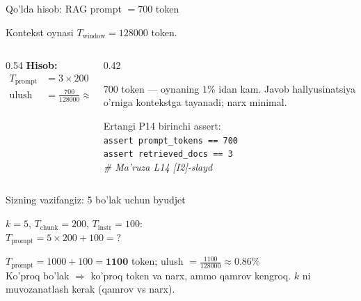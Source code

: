 \documentclass[aspectratio=169,11pt]{beamer}
\begin{document}
%
\begin{frame}{Qo'lda hisob: RAG prompt $= 700$ token}
  \begin{tcolorbox}[defbox,title={Berilgan: $k=3$, $T_{\text{chunk}}=200$, $T_{\text{instr}}=100$}]
    \small Kontekst oynasi $T_{\text{window}} = 128000$ token.
  \end{tcolorbox}
  \vspace{0.2em}
  \begin{columns}[T]
    \begin{column}{0.54\textwidth}
      \textbf{Hisob:}
      \begin{align*}
        T_{\text{prompt}} &= 3\times 200 + 100 = \mathbf{700}\\
        \text{ulush} &= \tfrac{700}{128000} \approx 0.0055 < 1\%
      \end{align*}
    \end{column}
    \begin{column}{0.42\textwidth}
      \begin{tcolorbox}[okbox,top=2pt,bottom=2pt]
        \footnotesize
        $700$ token --- oynaning $1\%$ idan kam. Javob hallyusinatsiya o'rniga
        kontekstga tayanadi; narx minimal.
      \end{tcolorbox}
      \vspace{3pt}
      \footnotesize\color{halfgray}
      Ertangi P14 birinchi assert:\\
      \texttt{assert prompt\_tokens == 700}\\
      \texttt{assert retrieved\_docs == 3}\\
      \textit{\# Ma'ruza L14 [I2]-slayd}
    \end{column}
  \end{columns}
\end{frame}

\begin{frame}{Sizning vazifangiz: 5 bo'lak uchun byudjet}
  \begin{tcolorbox}[warnbox,title=Savol --- 60 soniya]
    \small
    $k=5$, $T_{\text{chunk}}=200$, $T_{\text{instr}}=100$:\\[4pt]
    \textbf{\large $T_{\text{prompt}} = 5\times 200 + 100 = ?$}
  \end{tcolorbox}
  \pause
  \begin{tcolorbox}[okbox,title=Javob]
    \small
    $T_{\text{prompt}} = 1000 + 100 = \mathbf{1100}$ token; \quad
    ulush $= \tfrac{1100}{128000} \approx 0.86\%$\\[3pt]
    \footnotesize Ko'proq bo'lak $\Rightarrow$ ko'proq token va narx, ammo
    qamrov kengroq. $k$ ni muvozanatlash kerak (qamrov vs narx).
  \end{tcolorbox}
\end{frame}
\end{document}
